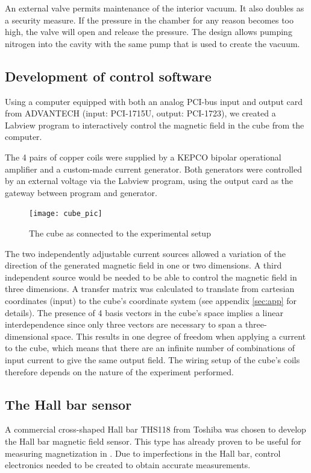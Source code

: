 \documentclass[journal,a4paper]{IEEEtran}
\begin{document}
An external valve permits maintenance of the interior vacuum. It also doubles as a security measure. If the pressure in the chamber for any reason becomes too high, the valve will open and release the pressure. The design allows pumping nitrogen into the cavity with the same pump that is used to create the vacuum.

\subsection{Development of control software}

Using a computer equipped with both an analog PCI-bus input and output card from ADVANTECH (input: PCI-1715U, output: PCI-1723), we created a Labview program to interactively control the magnetic field in the cube from the computer.

The 4 pairs of copper coils were supplied by a KEPCO bipolar operational amplifier and a custom-made current generator. Both generators were controlled by an external voltage via the Labview program, using the output card as the gateway between program and generator.

\begin{figure}[H]
\centering
\texttt{[image: cube\_pic]}
\caption{The cube as connected to the experimental setup}
\end{figure}

The two independently adjustable current sources allowed a variation of the direction of the generated magnetic field in one or two dimensions. A third independent source would be needed to be able to control the magnetic field in three dimensions. A transfer matrix was calculated to translate from cartesian coordinates (input) to the cube's coordinate system (see appendix \ref{sec:app} for details). The presence of 4 basis vectors in the cube's space implies a linear interdependence  since only three vectors are necessary to span a three-dimensional space. This results in one degree of freedom when applying a current to the cube, which means that there are an infinite number of combinations of input current to give the same output field. The wiring setup of the cube's coils therefore depends on the nature of the experiment performed.
 

\subsection{The Hall bar sensor}
A commercial cross-shaped Hall bar THS118 from Toshiba was chosen to develop the Hall bar magnetic field sensor. This type has already proven to be useful for measuring magnetization in \cite{nishioka}. Due to imperfections in the Hall bar, control electronics needed to be created to obtain accurate measurements. 
\end{document}
